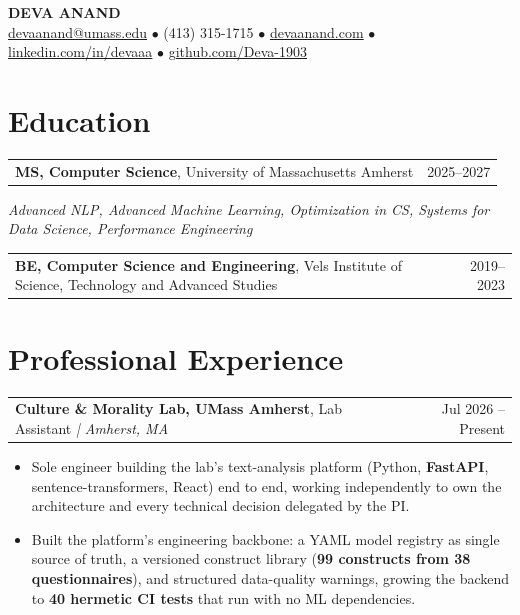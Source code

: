 \documentclass[letterpaper,11pt]{article}
\makeatletter
\newcommand{\eduItem}[3]{%
  \begin{tabular*}{\textwidth}{@{}l@{\extracolsep{\fill}}r@{}}
    \textbf{#1}, #2 & #3 \\
  \end{tabular*}\par
}
\newcommand{\expItem}[4]{%
  \vspace{2pt}
  \begin{tabular*}{\textwidth}{@{}l@{\extracolsep{\fill}}r@{}}
    \textbf{#1}, #2 \textit{| #3} & #4 \\
  \end{tabular*}\par\vspace{-3pt}
}
\makeatother
\begin{document}
\begin{center}
    {\fontsize{18}{20}\selectfont\bfseries DEVA ANAND}\\ \vspace{3pt}
    {\small
    \href{mailto:devaanand@umass.edu}{devaanand@umass.edu}
    \enspace$\bullet$\enspace
    (413) 315-1715
    \enspace$\bullet$\enspace
    \href{https://devaanand.com}{devaanand.com}
    \enspace$\bullet$\enspace
    \href{https://linkedin.com/in/devaaa/}{linkedin.com/in/devaaa}
    \enspace$\bullet$\enspace
    \href{https://github.com/Deva-1903}{github.com/Deva-1903}}
\end{center}
\vspace{-8pt}

\section{Education}
\eduItem{MS, Computer Science}{University of Massachusetts Amherst}{2025--2027}
{\small\textit{Advanced NLP, Advanced Machine Learning, Optimization in CS, Systems for Data Science, Performance Engineering}}\par
\vspace{3pt}
\eduItem{BE, Computer Science and Engineering}{Vels Institute of Science, Technology and Advanced Studies}{2019--2023}

\section{Professional Experience}

\expItem{Culture \& Morality Lab, UMass Amherst}{Lab Assistant}{Amherst, MA}{Jul 2026 -- Present}
\begin{itemize}
  \item Sole engineer building the lab's text-analysis platform (Python, \textbf{FastAPI}, sentence-transformers, React) end to end, working independently to own the architecture and every technical decision delegated by the PI.
  \item Built the platform's engineering backbone: a YAML model registry as single source of truth, a versioned construct library (\textbf{99 constructs from 38 questionnaires}), and structured data-quality warnings, growing the backend to \textbf{40 hermetic CI tests} that run with no ML dependencies.
\end{itemize}
\end{document}
